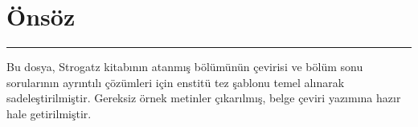 \chapter*{Önsöz}

\vspace{-0.6cm}
\rule{\textwidth}{0.3pt}\vspace{-0.35cm}

\begin{justify}
\begin{footnotesize}
Bu dosya, Strogatz kitabının atanmış bölümünün çevirisi ve bölüm sonu sorularının ayrıntılı çözümleri için enstitü tez şablonu temel alınarak sadeleştirilmiştir. Gereksiz örnek metinler çıkarılmış, belge çeviri yazımına hazır hale getirilmiştir.

\vspace{1cm}
\begin{flushright}
\textbf{\tezyazari}\\
\ay\ \yil
\end{flushright}
\end{footnotesize}
\end{justify}
\newpage
